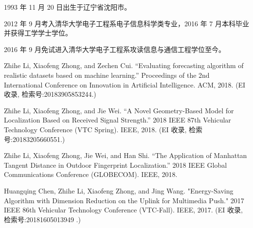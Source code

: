 \begin{resume}


  1993 年 11 月 20 日出生于辽宁省沈阳市。

  2012 年 9 月考入清华大学电子工程系电子信息科学类专业，2016 年 7 月本科毕业并获得工学学士学位。

  2016 年 9 月免试进入清华大学电子工程系攻读信息与通信工程学位至今。


  \begin{publications}
    \item Zhihe Li, Xiaofeng Zhong, and Zechen Cui. “Evaluating forecasting algorithm of realistic datasets based on machine learning.” Proceedings of the 2nd International Conference on Innovation in Artificial Intelligence. ACM, 2018. (EI 收录, 检索号:20183905853244.)
    \item Zhihe Li, Xiaofeng Zhong, and Jie Wei. “A Novel Geometry-Based Model for Localization Based on Received Signal Strength.” 2018 IEEE 87th Vehicular Technology Conference (VTC Spring). IEEE, 2018. (EI 收录, 检索号:20183205660551.)
    \item Zhihe Li, Xiaofeng Zhong, Jie Wei, and Han Shi. “The Application of Manhattan Tangent Distance in Outdoor Fingerprint Localization.” 2018 IEEE Global Communications Conference (GLOBECOM). IEEE, 2018. 
  \end{publications}

    

  \begin{publications}
    \item Huangqing Chen, Zhihe Li, Xiaofeng Zhong, and Jing Wang. "Energy-Saving Algorithm with Dimension Reduction on the Uplink for Multimedia Push." 2017 IEEE 86th Vehicular Technology Conference (VTC-Fall). IEEE, 2017. (EI 收录, 检索号:20181605013949 .)
  \end{publications}

    

\end{resume}

